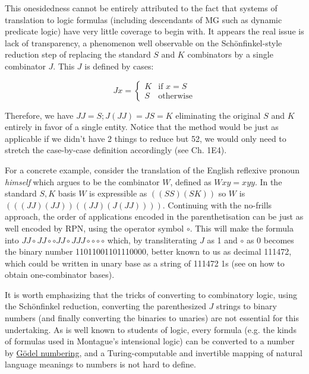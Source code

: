 \documentclass[output=paper,colorlinks=true,citecolor=brown]{langscibook}
\begin{document}
This onesidedness cannot be entirely attributed to the fact that systems of
translation to logic formulas (including descendants of MG such as dynamic
predicate logic) have very little coverage to begin with. It appears the real
issue is lack of transparency, a phenomenon well observable on the
Sch\"onfinkel-style reduction step of replacing the standard $S$ and $K$ 
combinators by a single combinator $J$. This  $J$ is defined by cases:

\[
  Jx =
  \begin{cases}
    K & \text{if } x=S\\
    S & \text{otherwise}
  \end{cases}
\]

\noindent
Therefore, we have $JJ = S; J(JJ)= JS = K$ eliminating the original $S$ and $K$
entirely in favor of a single entity. Notice that the method would be just as
applicable if we didn't have 2 things to reduce but 52, we would only need to
stretch the case-by-case definition accordingly (see \cite{Curry:1958}
Ch. 1E4). 

For a concrete example, consider the translation of the English reflexive
pronoun {\it himself} which \cite{Szabolcsi:1987} argues to be the combinator
$W$, defined as $W x y = x y y$. In the standard $S,K$ basis $W$ is
expressible as $((SS)(SK))$ so $W$ is $(((JJ)(JJ))((JJ)(J(JJ))))$. Continuing
with the no-frills approach, the order of applications encoded in the
parenthetisation can be just as well encoded by RPN, using the operator symbol
$\circ$. This will make the formula into $JJ\circ JJ\circ \circ
JJ\circ J JJ\circ \circ \circ \circ$ which, by transliterating $J$ as 1 and
$\circ$ as 0 becomes the binary number 11011001101110000, better known to us
as decimal 111472, which could be written in unary base as a string of 111472
1s (see \cite{Fokker:1989} on how to obtain one-combinator bases). 

It is worth emphasizing that the tricks of converting to combinatory logic,
using the Sch\"onfinkel reduction, converting the parenthesized $J$ strings to
binary numbers (and finally converting the binaries to unaries) are not
essential for this undertaking. As is well known to students of logic, every
formula (e.g. the kinds of formulas used in Montague's intensional logic) can
be converted to a number by
\href{https://en.wikipedia.org/wiki/Gödel_numbering}{G\"odel numbering}, and a
Turing-computable and invertible mapping of natural language meanings to
numbers is not hard to define.
\end{document}
